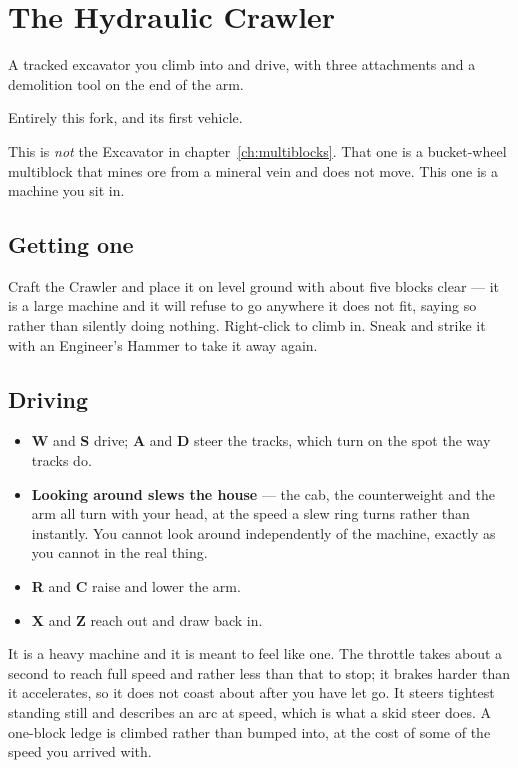 \chapter{The Hydraulic Crawler}
\label{ch:crawler}

A tracked excavator you climb into and drive, with three attachments and a demolition tool on the end
of the arm.

\begin{iefork}
Entirely this fork, and its first vehicle.
\end{iefork}

\begin{ietip}
This is \emph{not} the Excavator in chapter~\ref{ch:multiblocks}. That one is a bucket-wheel
multiblock that mines ore from a mineral vein and does not move. This one is a machine you sit in.
\end{ietip}

\section{Getting one}

Craft the Crawler and place it on level ground with about five blocks clear --- it is a large machine
and it will refuse to go anywhere it does not fit, saying so rather than silently doing nothing.
Right-click to climb in. Sneak and strike it with an Engineer's Hammer to take it away again.

\section{Driving}

\begin{itemize}
\item \textbf{W} and \textbf{S} drive; \textbf{A} and \textbf{D} steer the tracks, which turn on the
      spot the way tracks do.
\item \textbf{Looking around slews the house} --- the cab, the counterweight and the arm all turn
      with your head, at the speed a slew ring turns rather than instantly. You cannot look around
      independently of the machine, exactly as you cannot in the real thing.
\item \textbf{R} and \textbf{C} raise and lower the arm.
\item \textbf{X} and \textbf{Z} reach out and draw back in.
\end{itemize}

It is a heavy machine and it is meant to feel like one. The throttle takes about a second to reach
full speed and rather less than that to stop; it brakes harder than it accelerates, so it does not
coast about after you have let go. It steers tightest standing still and describes an arc at speed,
which is what a skid steer does. A one-block ledge is climbed rather than bumped into, at the cost of
some of the speed you arrived with.

